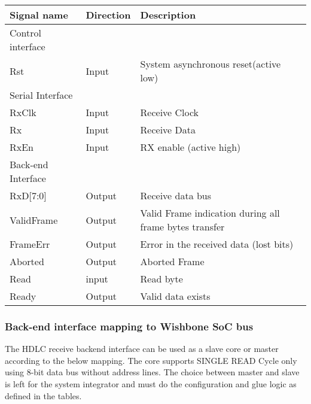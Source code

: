 \documentclass[a4paper,11pt]{article}
\begin{document}
\begin{tabular}{|l|l|l|}
\hline
Signal name& Direction& Description\\
\hline
\hline
Control interface & & \\
\hline
\hline
Rst & Input & System asynchronous reset(active low)\\
\hline
\hline
Serial Interface & & \\
\hline
\hline
RxClk & Input & Receive Clock\\
Rx & Input& Receive Data\\
RxEn & Input & RX enable (active high)\\
\hline
\hline
Back-end Interface & &\\
\hline
\hline
RxD[7:0]& Output& Receive data bus\\
ValidFrame& Output& Valid Frame indication during all frame bytes transfer\\
FrameErr& Output& Error in the received data (lost bits)\\
Aborted& Output& Aborted Frame\\
Read& input& Read byte\\
Ready& Output& Valid data exists\\
\hline
\end{tabular}

\subsubsection{Back-end interface mapping to Wishbone SoC bus}
The HDLC receive backend interface can be used as a slave core or master according to the below mapping. The core supports SINGLE READ Cycle only using 8-bit data bus without address lines. The choice between master and slave is left for the system integrator and must do the configuration and glue logic as defined in the tables.  
\end{document}
